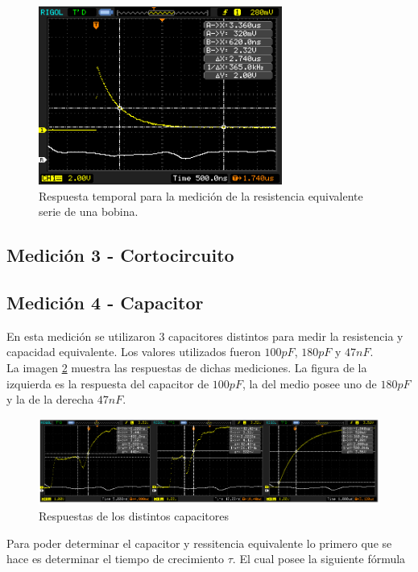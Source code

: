 \documentclass[a4paper,10pt]{article}
\begin{document}
		\begin{figure}[!htb]
			\centering
			\includegraphics[width=8cm]
			{Imagenes/InductorR.png}
			\caption{Respuesta temporal para la medici\'on de la resistencia equivalente serie de una bobina.}
			\label{img007}
		\end{figure}			
	
	
	\subsection{Medición 3 - Cortocircuito}

	\subsection{Medición 4 - Capacitor}
	\indent En esta medición se utilizaron 3 capacitores distintos para medir
	la resistencia y capacidad equivalente. Los valores utilizados fueron 
	$100pF$, $180pF$ y $47nF$. \\
	\indent La imagen \ref{img010} muestra las respuestas de dichas 
	mediciones. La figura de la izquierda es la respuesta del capacitor de 
	$100pF$, la del medio posee uno de $180pF$ y la de la derecha $47nF$. \\
	
		\begin{figure}[!htb]
			\centering
			\includegraphics[width=12cm]
			{Imagenes/CurvasCapacitor.png}
			\caption{Respuestas de los distintos capacitores}
			\label{img010} 
		\end{figure}

	\indent Para poder determinar el capacitor y ressitencia equivalente lo 
	primero que se hace es determinar el tiempo de crecimiento $\tau$. El cual
	posee la siguiente fórmula
\end{document}
